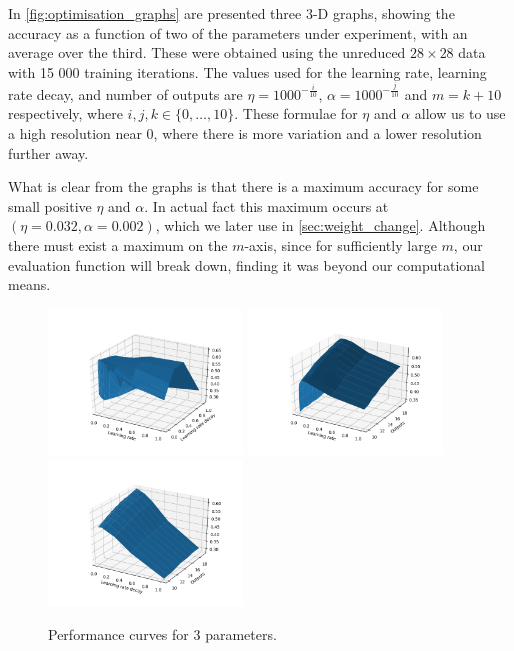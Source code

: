 \documentclass[a4paper, 11pt, twocolumn, final]{article} %
\begin{document}
In \autoref{fig:optimisation_graphs} are presented three 3-D graphs, showing the
accuracy as a function of two of the parameters under experiment, with an
average over the third.  These were obtained using the unreduced $28 \times 28$
data with 15 000 training iterations.  The values used for the learning rate,
learning rate decay, and number of outputs are $\eta = 1000^{-\frac{i}{10}}$,
$\alpha = 1000^{-\frac{j}{10}}$ and $m = k + 10$ respectively, where $i, j, k
\in \{0, \ldots, 10\}$.  These formulae for $\eta$ and $\alpha$ allow us to use
a high resolution near 0, where there is more variation and a lower resolution
further away.

What is clear from the graphs is that there is a maximum accuracy for some small
positive $\eta$ and $\alpha$.  In actual fact this maximum occurs at $(\eta =
0.032, \alpha = 0.002)$, which we later use in \autoref{sec:weight_change}.
Although there must exist a maximum on the $m$-axis, since for sufficiently
large $m$, our evaluation function will break down, finding it was beyond our
computational means.

\begin{figure}
  \includegraphics[width=0.46\textwidth]{optimisation/01.png}
  \includegraphics[width=0.46\textwidth]{optimisation/02.png}
  \includegraphics[width=0.46\textwidth]{optimisation/12.png}
  \caption{Performance curves for 3 parameters.}
  \label{fig:optimisation_graphs}
\end{figure}
\end{document}
